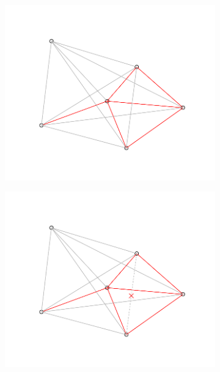 \begin{figure}[h]
\begin{subfigure}{0.25\textwidth}
  \includegraphics[width=\linewidth]{./pictures/4/triangulation_7.pdf}
  \label{fig:3-triangulation_7}
\end{subfigure}\hfil %
\begin{subfigure}{0.25\textwidth}
  \includegraphics[width=\linewidth]{./pictures/4/triangulation_8.pdf}
  \label{fig:3-triangulation_8}
\end{subfigure}\hfil %
\begin{subfigure}{0.25\textwidth}

\end{subfigure}
\end{figure}
